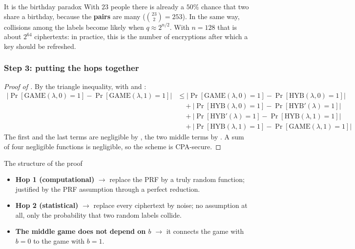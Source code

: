 \begin{framedobs}{It is the birthday paradox}
  With $23$ people there is already a $50\%$ chance that two share a birthday, because the \textbf{pairs} are many ($\binom{23}{2} = 253$). In the same way, collisions among the labels become likely when $q \approx 2^{n/2}$. With $n = 128$ that is about $2^{64}$ ciphertexts: in practice, this is the number of encryptions after which a key should be refreshed.
\end{framedobs}

\subsubsection{Step 3: putting the hops together}

\begin{proof}[Proof of ]
  By the triangle inequality, with  and :
  \[
    \begin{aligned}
      \big|\Pr[\mathrm{GAME}(\lambda, 0) = 1] - \Pr[\mathrm{GAME}(\lambda, 1) = 1]\big|
      &\leq \big|\Pr[\mathrm{GAME}(\lambda, 0) = 1] - \Pr[\mathrm{HYB}(\lambda, 0) = 1]\big| \\
      &\quad + \big|\Pr[\mathrm{HYB}(\lambda, 0) = 1] - \Pr[\mathrm{HYB}'(\lambda) = 1]\big| \\
      &\quad + \big|\Pr[\mathrm{HYB}'(\lambda) = 1] - \Pr[\mathrm{HYB}(\lambda, 1) = 1]\big| \\
      &\quad + \big|\Pr[\mathrm{HYB}(\lambda, 1) = 1] - \Pr[\mathrm{GAME}(\lambda, 1) = 1]\big| 
    \end{aligned}
  \]
  The first and the last terms are negligible by , the two middle terms by . A sum of four negligible functions is negligible, so the scheme is CPA-secure.
\end{proof}

\begin{framedobs}{The structure of the proof}
  \begin{itemize}
    \item \textbf{Hop 1 (computational)} $\to$ replace the PRF by a truly random function; justified by the PRF assumption through a perfect reduction.
    \item \textbf{Hop 2 (statistical)} $\to$ replace every ciphertext by noise; no assumption at all, only the probability that two random labels collide.
    \item \textbf{The middle game does not depend on $b$} $\to$ it connects the game with $b = 0$ to the game with $b = 1$.
  \end{itemize}
\end{framedobs}
